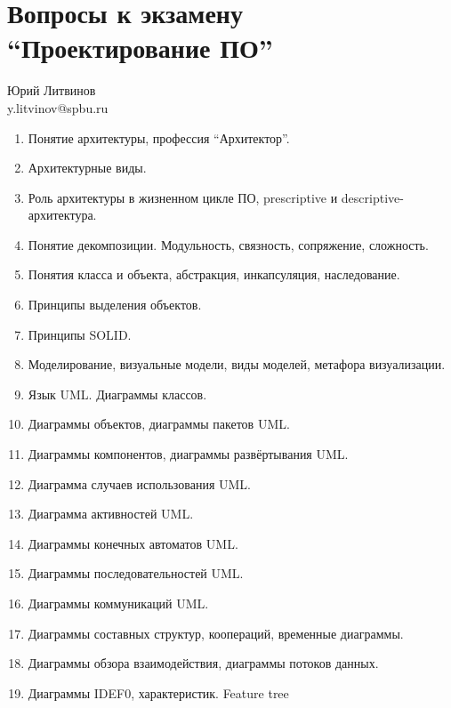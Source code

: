 \documentclass[a5paper]{article}
\begin{document}
\thispagestyle{empty}

\section*{Вопросы к экзамену \enquote{Проектирование ПО}}

\begin{flushright}\begin{small}Юрий Литвинов\\\small{y.litvinov@spbu.ru}\end{small}\end{flushright}

\begin{enumerate}
    \item Понятие архитектуры, профессия \enquote{Архитектор}.
    \item Архитектурные виды.
    \item Роль архитектуры в жизненном цикле ПО, prescriptive и descriptive-архитектура.
    \item Понятие декомпозиции. Модульность, связность, сопряжение, сложность.
    \item Понятия класса и объекта, абстракция, инкапсуляция, наследование. 
    \item Принципы выделения объектов.
    \item Принципы SOLID.
    \item Моделирование, визуальные модели, виды моделей, метафора визуализации.
    \item Язык UML. Диаграммы классов.
    \item Диаграммы объектов, диаграммы пакетов UML.
    \item Диаграммы компонентов, диаграммы развёртывания UML.
    \item Диаграмма случаев использования UML.
    \item Диаграмма активностей UML.
    \item Диаграммы конечных автоматов UML.
    \item Диаграммы последовательностей UML.
    \item Диаграммы коммуникаций UML.
    \item Диаграммы составных структур, коопераций, временные диаграммы.
    \item Диаграммы обзора взаимодействия, диаграммы потоков данных.
    \item Диаграммы IDEF0, характеристик. Feature tree 

\end{enumerate}
\end{document}

